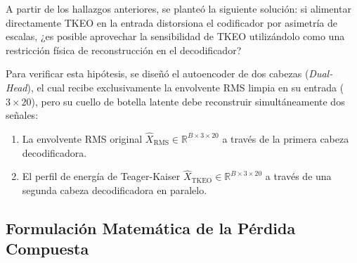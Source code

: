 \documentclass[11pt,a4paper]{article}
\begin{document}
A partir de los hallazgos anteriores, se planteó la siguiente solución: si alimentar directamente TKEO en la entrada distorsiona el codificador por asimetría de escalas, ¿es posible aprovechar la sensibilidad de TKEO utilizándolo como una restricción física de reconstrucción en el decodificador?

Para verificar esta hipótesis, se diseñó el autoencoder de dos cabezas (\textit{Dual-Head}), el cual recibe exclusivamente la envolvente RMS limpia en su entrada ($3 \times 20$), pero su cuello de botella latente debe reconstruir simultáneamente dos señales:
\begin{enumerate}
    \item La envolvente RMS original $\hat{X}_{\text{RMS}} \in \mathbb{R}^{B \times 3 \times 20}$ a través de la primera cabeza decodificadora.
    \item El perfil de energía de Teager-Kaiser $\hat{X}_{\text{TKEO}} \in \mathbb{R}^{B \times 3 \times 20}$ a través de una segunda cabeza decodificadora en paralelo.
\end{enumerate}

\subsection{Formulación Matemática de la Pérdida Compuesta}
\label{subsec:form_perdida_compuesta}
\end{document}
